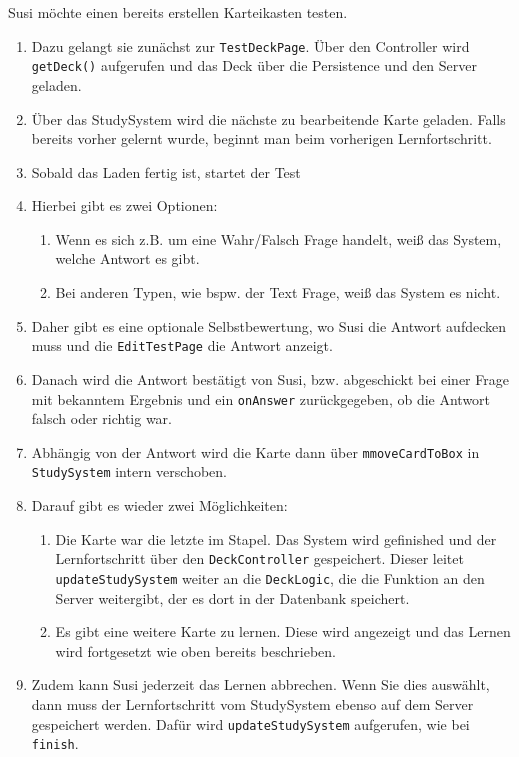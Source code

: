 \documentclass[fontsize=12pt,paper=A4,twoside]{scrartcl}
\begin{document}
    \newpage
    Susi möchte einen bereits erstellen Karteikasten testen.
    \begin{enumerate}
    \item Dazu gelangt sie zunächst zur \texttt{TestDeckPage}. Über den Controller wird \texttt{getDeck()} aufgerufen und das Deck über die Persistence und den Server geladen.
    \item Über das StudySystem wird die nächste zu bearbeitende Karte geladen. Falls bereits vorher gelernt wurde, beginnt man beim vorherigen Lernfortschritt.
    \item Sobald das Laden fertig ist, startet der Test
    \item Hierbei gibt es zwei Optionen:
        \begin {enumerate}
        \item  Wenn es sich z.B. um eine Wahr/Falsch Frage handelt, weiß das System, welche Antwort es gibt. 
        \item Bei anderen Typen, wie bspw. der Text Frage, weiß das System es nicht. 
        \end {enumerate}
     \item Daher gibt es eine optionale Selbstbewertung, wo Susi die Antwort aufdecken muss und die \texttt{EditTestPage} die Antwort anzeigt.
     \item Danach wird die Antwort bestätigt von Susi, bzw. abgeschickt bei einer Frage mit bekanntem Ergebnis und ein \texttt{onAnswer} zurückgegeben, ob die Antwort falsch 
    oder richtig war.
    \item Abhängig von der Antwort wird die Karte dann über \texttt{mmoveCardToBox} in \texttt{StudySystem} intern verschoben.
    \item Darauf gibt es wieder zwei Möglichkeiten: 
        \begin {enumerate}
        \item Die Karte war die letzte im Stapel. Das System wird gefinished und der Lernfortschritt über den \texttt{DeckController} gespeichert. Dieser leitet 
        \texttt{updateStudySystem} weiter an die \texttt{DeckLogic}, die die Funktion an den Server weitergibt, der es dort in der Datenbank speichert.
        \item Es gibt eine weitere Karte zu lernen. Diese wird angezeigt und das Lernen wird fortgesetzt wie oben bereits beschrieben.   
        \end {enumerate}
    \item Zudem kann Susi jederzeit das Lernen abbrechen. Wenn Sie dies auswählt, dann muss der Lernfortschritt vom StudySystem ebenso auf dem Server gespeichert werden. Dafür wird 
     \texttt{updateStudySystem} aufgerufen, wie bei \texttt{finish}.
    \end{enumerate}
\end{document}
